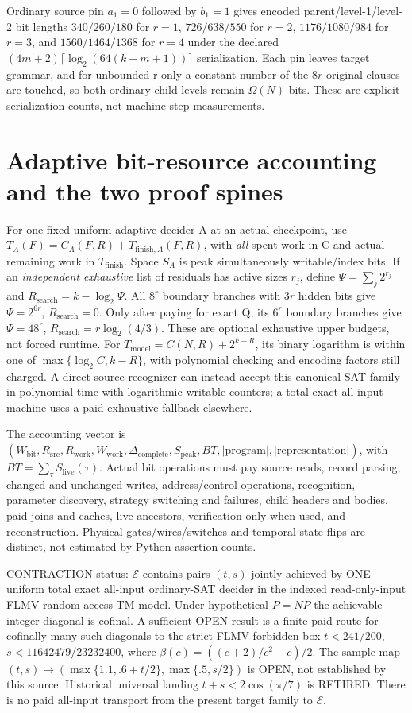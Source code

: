 \documentclass[11pt]{article}
\begin{document}
Ordinary source pin $a_1=0$ followed by $b_1=1$ gives encoded parent/level-1/level-2 bit lengths $340/260/180$ for $r=1$, $726/638/550$ for $r=2$, $1176/1080/984$ for $r=3$, and $1560/1464/1368$ for $r=4$ under the declared $(4m+2)\lceil\log_2(64(k+m+1))\rceil$ serialization. Each pin leaves target grammar, and for unbounded r only a constant number of the $8r$ original clauses are touched, so both ordinary child levels remain $\Omega(N)$ bits. These are explicit serialization counts, not machine step measurements.

\section{Adaptive bit-resource accounting and the two proof spines}
For one fixed uniform adaptive decider A at an actual checkpoint, use $T_A(F)=C_A(F,R)+T_{\mathrm{finish},A}(F,R)$, with \emph{all} spent work in C and actual remaining work in $T_{\mathrm{finish}}$. Space $S_A$ is peak simultaneously writable/index bits. If an \emph{independent exhaustive} list of residuals has active sizes $r_j$, define $\Psi=\sum_j2^{r_j}$ and $R_{\mathrm{search}}=k-\log_2\Psi$. All $8^r$ boundary branches with $3r$ hidden bits give $\Psi=2^{6r}$, $R_{\mathrm{search}}=0$. Only after paying for exact Q, its $6^r$ boundary branches give $\Psi=48^r$, $R_{\mathrm{search}}=r\log_2(4/3)$. These are optional exhaustive upper budgets, not forced runtime. For $T_{\mathrm{model}}=C(N,R)+2^{k-R}$, its binary logarithm is within one of $\max\{\log_2 C,k-R\}$, with polynomial checking and encoding factors still charged. A direct source recognizer can instead accept this canonical SAT family in polynomial time with logarithmic writable counters; a total exact all-input machine uses a paid exhaustive fallback elsewhere.

The accounting vector is $(W_{\mathrm{bit}},R_{\mathrm{src}},R_{\mathrm{work}},W_{\mathrm{work}},
\Delta_{\mathrm{complete}},S_{\mathrm{peak}},BT,|\mathrm{program}|,|\mathrm{representation}|)$, with $BT=\sum_{\tau}S_{\mathrm{live}}(\tau)$. Actual bit operations must pay source reads, record parsing, changed and unchanged writes, address/control operations, recognition, parameter discovery, strategy switching and failures, child headers and bodies, paid joins and caches, live ancestors, verification only when used, and reconstruction. Physical gates/wires/switches and temporal state flips are distinct, not estimated by Python assertion counts.

CONTRACTION status: $\mathcal E$ contains pairs $(t,s)$ jointly achieved by ONE uniform total exact all-input ordinary-SAT decider in the indexed read-only-input FLMV random-access TM model. Under hypothetical $P=NP$ the achievable integer diagonal is cofinal. A sufficient OPEN result is a finite paid route for cofinally many such diagonals to the strict FLMV forbidden box $t<241/200$, $s<11642479/23232400$, where $\beta(c)=((c+2)/c^2-c)/2$. The sample map $(t,s)\mapsto(\max\{1.1,.6+t/2\},\max\{.5,s/2\})$ is OPEN, not established by this source. Historical universal landing $t+s<2\cos(\pi/7)$ is RETIRED. There is no paid all-input transport from the present target family to $\mathcal E$.
\end{document}
